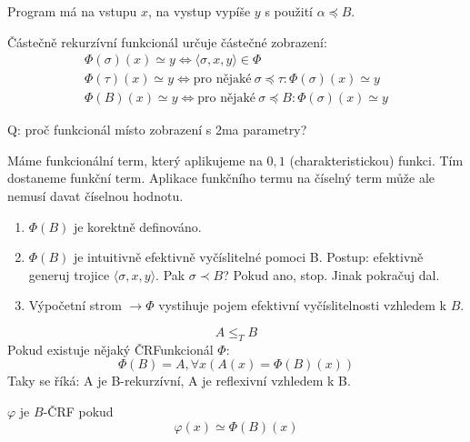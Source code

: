 \begin{example}
	Program má na vstupu $x$, na vystup vypíše $y$ s použití $\alpha \preccurlyeq B$.
\end{example}

\begin{definition}
	Částečně rekurzívní funkcionál určuje částečné zobrazení:
	\begin{gather*}
		\Phi(\sigma)(x) \simeq y \iff \langle \sigma, x, y \rangle \in \Phi \\
		\Phi(\tau)(x) \simeq y \iff \text{pro nějaké}\ \sigma \preccurlyeq \tau: \Phi(\sigma)(x) \simeq y\\
		\Phi(B)(x) \simeq y \iff \text{pro nějaké}\ \sigma \preccurlyeq B: \Phi(\sigma)(x) \simeq y
	\end{gather*}
\end{definition}

Q: proč funkcionál místo zobrazení s 2ma parametry?

\begin{note}
	Máme funkcionální term, který aplikujeme na $0,1$ (charakteristickou) funkci.
	Tím dostaneme funkční term. Aplikace funkčního termu na číselný term může ale nemusí davat číselnou hodnotu.
\end{note}

\begin{properties}
	\begin{enumerate}
		\item $\Phi(B)$ je korektně definováno.
		\item $\Phi(B)$ je intuitivně efektivně vyčíslitelné pomoci B.
			Postup: efektivně generuj trojice $\langle \sigma, x, y \rangle$.
			Pak $\sigma \prec B$? Pokud ano, stop.
			Jinak pokračuj dal.
		\item Výpočetní strom $\to \Phi$ vystihuje pojem efektivní vyčíslitelnosti vzhledem k $B$.
	\end{enumerate}
\end{properties}

\begin{definition}[T-Převoditelnost]
	\[ A \leq_T B \]
	Pokud existuje nějaký ČRFunkcionál $\Phi$:
	\[ \Phi(B) = A, \forall x( A(x) = \Phi(B)(x)) \]
	Taky se říká: A je B-rekurzívní, A je reflexivní vzhledem k B.
\end{definition}

\begin{definition}
	$\varphi$ je $B$-ČRF pokud
	\[ \varphi(x) \simeq \Phi(B)(x) \]
\end{definition}

